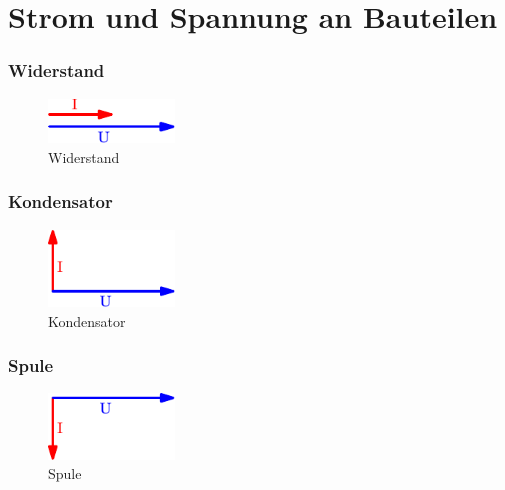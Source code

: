 



\section{Strom und Spannung an Bauteilen}

\subsubsection{Widerstand}
\begin{figure}[h!]
	\centering
	\includegraphics[width=0.3\textwidth]{zeig_ui_wid.pdf}
	\caption{Widerstand}
	\label{fig:zeig_ui_wid}
\end{figure}

\subsubsection{Kondensator}
\begin{figure}[h!]
	\centering
	\includegraphics[width=0.3\textwidth]{zeig_ui_kap.pdf}
	\caption{Kondensator}
	\label{fig:zeig_ui_kap}
\end{figure}

\subsubsection{Spule}
\begin{figure}[h!]
	\centering
	\includegraphics[width=0.3\textwidth]{zeig_ui_ind.pdf}
	\caption{Spule}
	\label{fig:zeig_ui_ind}
\end{figure}
